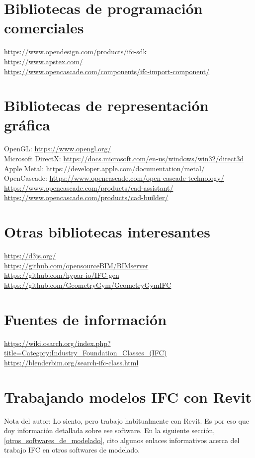 \documentclass[spanish,12pt,a4paper,final,oneside]{book}
\begin{document}
\section{Bibliotecas de programación comerciales}
\url{https://www.opendesign.com/products/ifc-sdk}
\\ \url{https://www.apstex.com/}
\\ \url{https://www.opencascade.com/components/ifc-import-component/}

\section{Bibliotecas de representación gráfica}
OpenGL: \url{https://www.opengl.org/}
\\Microsoft DirectX: \url{https://docs.microsoft.com/en-us/windows/win32/direct3d}
\\Apple Metal: \url{https://developer.apple.com/documentation/metal/}
\\OpenCascade: \url{https://www.opencascade.com/open-cascade-technology/}
\\ \url{https://www.opencascade.com/products/cad-assistant/}
\\ \url{https://www.opencascade.com/products/cad-builder/}

\section{Otras bibliotecas interesantes}
\url{https://d3js.org/}
\\ \url{https://github.com/opensourceBIM/BIMserver}
\\ \url{https://github.com/hypar-io/IFC-gen}
\\ \url{https://github.com/GeometryGym/GeometryGymIFC}

\section{Fuentes de información}
\url{https://wiki.osarch.org/index.php?title=Category:Industry_Foundation_Classes_(IFC)}
\\ \url{https://blenderbim.org/search-ifc-class.html}



\section{Trabajando modelos IFC con Revit}
Nota del autor: Lo siento, pero trabajo habitualmente con Revit. Es por eso que doy información detallada sobre ese software. En la siguiente sección, \ref{otros_softwares_de_modelado}, cito algunos enlaces informativos acerca del trabajo IFC en otros softwares de modelado.
\end{document}

